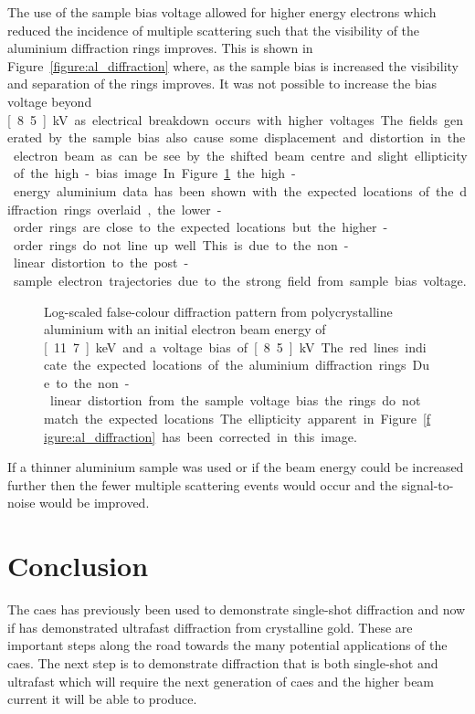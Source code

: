 The use of the sample bias voltage allowed for higher energy electrons which reduced the incidence of multiple scattering such that the visibility of the aluminium diffraction rings improves.
This is shown in Figure~\ref{figure:al_diffraction} where, as the sample bias is increased the visibility and separation of the rings improves.
It was not possible to increase the bias voltage beyond \unit[8.5]{kV} as electrical breakdown occurs with higher voltages.
The fields generated by the sample bias also cause some displacement and distortion in the electron beam as can be see by the shifted beam centre and slight ellipticity of the high-bias image.

In Figure~\ref{figure:al_diffraction_rings} the high-energy aluminium data has been shown with the expected locations of the diffraction rings overlaid, the lower-order rings are close to the expected locations but the higher-order rings do not line up well.
This is due to the non-linear distortion to the post-sample electron trajectories due to the strong field from sample bias voltage.

\begin{figure}
    \center
    
    \caption[Diffraction pattern from aluminium demonstrating the distortion from the voltage bias.]{Log-scaled false-colour diffraction pattern from polycrystalline aluminium with an initial electron beam energy of \unit[11.7]{keV} and a voltage bias of \unit[8.5]{kV}. The red lines indicate the expected locations of the aluminium diffraction rings. Due to the non-linear distortion from the sample voltage bias the rings do not match the expected locations. The ellipticity apparent in Figure~\ref{figure:al_diffraction} has been corrected in this image.}
    \label{figure:al_diffraction_rings}
\end{figure}

If a thinner aluminium sample was used or if the beam energy could be increased further then the fewer multiple scattering events would occur and the signal-to-noise would be improved.

\section{Conclusion}

The \gls{caes} has previously been used to demonstrate single-shot diffraction and now if has demonstrated ultrafast diffraction from crystalline gold.
These are important steps along the road towards the many potential applications of the \gls{caes}.
The next step is to demonstrate diffraction that is both single-shot and ultrafast which will require the next generation of \gls{caes} and the higher beam current it will be able to produce.